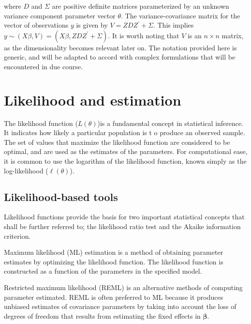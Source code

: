 \documentclass[12pt, a4paper]{report}
\theoremstyle{plain}
\theoremstyle{definition}
\theoremstyle{remark}
\begin{document}
where $D$ and $\Sigma$ are positive definite matrices parameterized by an unknown variance component parameter vector $ \theta.$ The variance-covariance matrix for the vector of observations $y$ is given by $V = ZDZ^{\prime}+ \Sigma.$ This implies $y \sim(X\beta, V) = (X\beta,ZDZ^{\prime}+ \Sigma)$. It is worth noting that $V$ is an $n \times n$ matrix, as the dimensionality becomes relevant later on. The notation provided here is generic, and will be adapted to accord with complex formulations that will be encountered in due course.




\section{Likelihood and estimation}
The likelihood function ($L(\theta)$)is a fundamental concept in statistical
inference. It indicates how likely a particular population is t o
produce an observed sample. The set of values that maximize the
likelihood function are considered to be optimal, and are used as
the estimates of the parameters. For computational ease, it is common to use the logarithm of the likelihood function, known simply as the log-likelihood ($\ell(\theta)$).

\subsection{Likelihood-based tools}
Likelihood functions provide the basis for two important statistical concepts that shall be further referred to; the likelihood ratio test and the Akaike information criterion.

Maximum likelihood (ML) estimation is a method of obtaining
parameter estimates by optimizing the likelihood function. The
likelihood function is constructed as a function of the parameters
in the specified model.

Restricted maximum likelihood (REML) is an alternative methods of
computing parameter estimated. REML is often preferred to ML
because it produces unbiased estimates of covariance parameters by
taking into account the loss of degrees of freedom that results
from estimating the fixed effects in $\boldsymbol{\beta}$.
\end{document}
